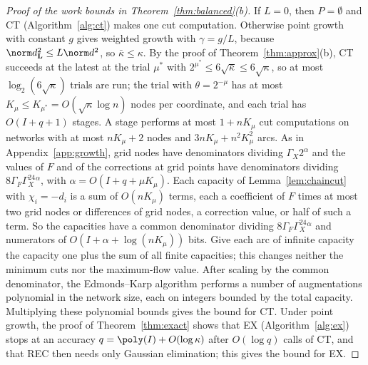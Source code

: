 \begin{proof}[Proof of the work bounds in Theorem~\ref{thm:balanced}(b)]
If $L=0$, then $P=\emptyset$ and CT (Algorithm~\ref{alg:ct}) makes one cut
computation. Otherwise point growth with constant $g$ gives weighted growth
with $\gamma=g/L$, because $\norm d_{\mathbf L}^2\le L\norm d^2$, so
$\bar\kappa\le\kappa$. By the proof of Theorem~\ref{thm:approx}(b), CT
succeeds at the latest at the trial $\mu^*$ with
$2^{\mu^*}\le6\sqrt{\bar\kappa}\le6\sqrt\kappa$, so at most
$\log_2(6\sqrt\kappa)$ trials are run; the trial with $\theta=2^{-\mu}$ has
at most $K_\mu\le K_{\mu^*}=O(\sqrt\kappa\log n)$ nodes per coordinate, and
each trial has $O(I+q+1)$ stages. A stage performs at most $1+nK_\mu$ cut
computations on networks with at most $nK_\mu+2$ nodes and
$3nK_\mu+n^2K_\mu^2$ arcs. As in
Appendix~\ref{app:growth}, grid nodes have denominators dividing
$\Gamma_X2^\alpha$ and the values of $F$ and of the corrections at grid
points have denominators dividing $8\Gamma_F\Gamma_X^24^\alpha$, with
$\alpha=O(I+q+\mu K_\mu)$. Each capacity of Lemma~\ref{lem:chaincut} with
$\chi_i=-d_i$ is a sum of $O(nK_\mu)$ terms, each a coefficient of $F$ times
at most two grid nodes or differences of grid nodes, a correction value, or
half of such a term. So the capacities have a common denominator dividing
$8\Gamma_F\Gamma_X^24^\alpha$ and numerators of $O(I+\alpha+\log(nK_\mu))$
bits. Give each arc of infinite capacity the capacity one plus the sum of
all finite capacities; this changes neither the minimum cuts nor the
maximum-flow value. After scaling by the common denominator, the
Edmonds--Karp algorithm performs a number of augmentations polynomial in the
network size, each on integers bounded by the total capacity. Multiplying
these polynomial bounds gives the bound for CT. Under point growth, the
proof of Theorem~\ref{thm:exact} shows that EX (Algorithm~\ref{alg:ex})
stops at an accuracy $q=\poly(I)+O(\log\kappa)$ after $O(\log q)$ calls of
CT, and that REC then needs only Gaussian elimination; this gives the bound
for EX.
\end{proof}
